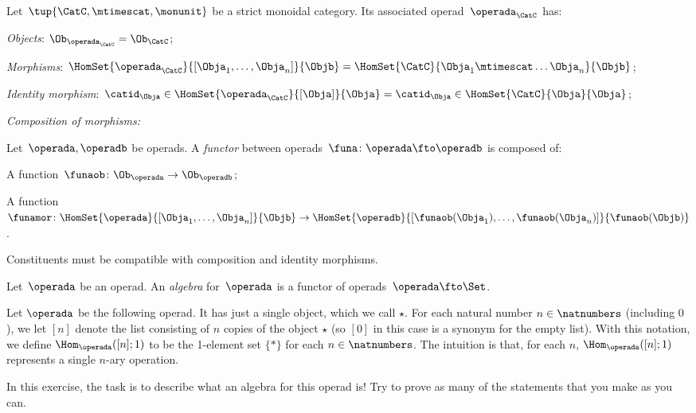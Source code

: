 \begin{definition}
  \label{def:operad_from_monoidal}
  Let~$\tup{\CatC,\mtimescat,\monunit}$ be a strict monoidal category. Its associated operad~$\operada_\CatC$ has:
  \begin{compactenum}
    \item \emph{Objects}: $\Ob_{\operada_\CatC}=\Ob_\CatC$;
    \item \emph{Morphisms}: $\HomSet{\operada_\CatC}{[\Obja_1,\ldots,\Obja_n]}{\Objb}=\HomSet{\CatC}{\Obja_1\mtimescat\ldots \Obja_n}{\Objb}$;
    \item \emph{Identity morphism}: $\catid_\Obja \in \HomSet{\operada_\CatC}{[\Obja]}{\Obja}=\catid_\Obja \in \HomSet{\CatC}{\Obja}{\Obja}$;
    \item \emph{Composition of morphisms:}
  \end{compactenum}
\end{definition}

\begin{definition}
  \label{def:functors_operads}
  Let~$\operada,\operadb$ be operads. A \emph{functor} between operads~$\funa\colon \operada \fto \operadb$  is composed of:
  \begin{compactenum}
    \item A function~$\funaob\colon \Ob_\operada\to \Ob_\operadb$;
    \item A function~$\funamor\colon \HomSet{\operada}{[\Obja_1,\ldots,\Obja_n]}{\Objb}\to \HomSet{\operadb}{[\funaob(\Obja_1),\ldots, \funaob(\Obja_n)]}{\funaob(\Objb)}$.
  \end{compactenum}
  Constituents must be compatible with composition and identity morphisms.
\end{definition}

\begin{definition}
  \label{def:algebra_operad}
  Let~$\operada$ be an operad. An \emph{algebra} for~$\operada$ is a functor of operads~$\operada \fto \Set$.
\end{definition}

\begin{gradedexercise}\label{ex:MonoidsAsAlgebras}
Let $\operada$ be the following operad. It has just a single object, which we call $\star$.  For each natural number $n \in \natnumbers$ (including $0$), we let $[n]$ denote the list consisting of $n$ copies of the object $\star$ (so $[0]$ in this case is a synonym for the empty list). With this notation, we define $\Hom_\operada([n];1)$ to be the 1-element set $\{ * \}$ for each $n \in \natnumbers$. The intuition is that, for each $n$, $\Hom_\operada([n];1)$ represents a single $n$-ary operation. 

In this exercise, the task is to describe what an algebra for this operad is! Try to prove as many of the statements that you make as you can. 
\end{gradedexercise}

